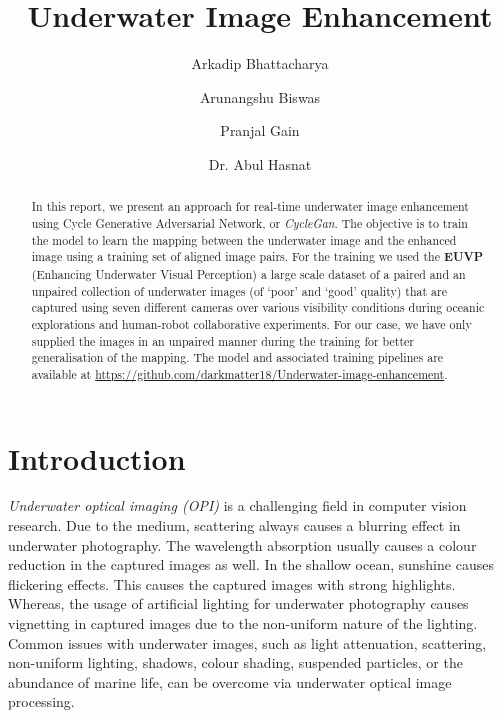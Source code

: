 \documentclass[a4paper]{article}
\title{Underwater Image Enhancement}
\author[1]{Arkadip Bhattacharya}
\author[2]{Arunangshu Biswas}
\author[3]{Pranjal Gain}
\author[+]{Dr. Abul Hasnat}
\affil[+]{Guide, Assistant Professor}
\affil[1,2,3]{Government College of Engineering and Textile Technology, Berhampore}
\begin{document}
\maketitle
\thispagestyle{fancy}

\begin{abstract}
In this report, we present an approach for real-time underwater image enhancement using Cycle Generative Adversarial Network, or \textit{CycleGan}. The objective is to train the model to learn the mapping between the underwater image and the enhanced image using a training set of aligned image pairs. For the training we used the \textbf{EUVP} (Enhancing Underwater Visual Perception) a large scale dataset of a paired and an unpaired collection of underwater images (of ‘poor’ and ‘good’ quality) that are captured using seven different cameras over various visibility conditions during oceanic explorations and human-robot collaborative experiments. For our case, we have only supplied the images in an unpaired manner during the training for better generalisation of the mapping. The model and associated training pipelines are available at \url{https://github.com/darkmatter18/Underwater-image-enhancement}.
\end{abstract}

\section{Introduction}
\textit{Underwater optical imaging (OPI)} is a challenging field in computer vision research. Due to the medium, scattering always causes a blurring effect in underwater photography. The wavelength absorption usually causes a colour reduction in the captured images as well. In the shallow ocean, sunshine causes flickering effects. This causes the captured images with strong highlights. Whereas, the usage of artificial lighting for underwater photography causes vignetting in captured images due to the non-uniform nature of the lighting. Common issues with underwater images, such as light attenuation, scattering, non-uniform lighting, shadows, colour shading, suspended particles, or the abundance of marine life, can be overcome via underwater optical image processing.
\end{document}
